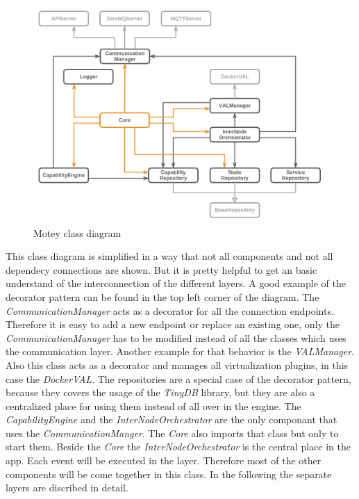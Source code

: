 \begin{figure}[H]
    \centering
    \includegraphics[width=\textwidth]{resources/images/class_diagram.png}
    \caption[Motey class diagram]{Motey class diagram}
    \label{fig:motey_class_diagram}
\end{figure}

This class diagram is simplified in a way that not all components and not all dependecy connections are shown.
But it is pretty helpful to get an basic understand of the interconnection of the different layers.
A good example of the decorator pattern can be found in the top left corner of the diagram.
The \textit{CommunicationManager} acts as a decorator for all the connection endpoints.
Therefore it is easy to add a new endpoint or replace an existing one, only the \textit{CommunicationManager} has to be modified instead of all the classes which uses the communication layer.
Another example for that behavior is the \textit{VALManager}.
Also this class acts as a decorator and manages all virtualization plugins, in this case the \textit{DockerVAL}.
The repositories are a special case of the decorator pattern, because they covers the usage of the \textit{TinyDB} library, but they are also a centralized place for using them instead of all over in the engine.
The \textit{CapabilityEngine} and the \textit{InterNodeOrchestrator} are the only componant that uses the \textit{CommunicationManger}.
The \textit{Core} also imports that class but only to start them.
Beside the \textit{Core} the \textit{InterNodeOrchestrator} is the central place in the app.
Each event will be executed in the layer.
Therefore most of the other components will be come together in this class.
In the following the separate layers are discribed in detail.



